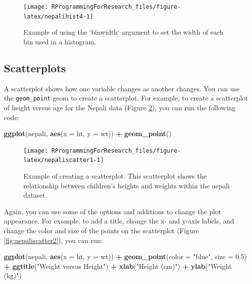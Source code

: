 \documentclass[]{book}
\makeatletter
\newenvironment{Shaded}{\begin{snugshade}}{\end{snugshade}}
\newcommand{\KeywordTok}[1]{\textcolor[rgb]{0.13,0.29,0.53}{\textbf{#1}}}
\newcommand{\DataTypeTok}[1]{\textcolor[rgb]{0.13,0.29,0.53}{#1}}
\newcommand{\FloatTok}[1]{\textcolor[rgb]{0.00,0.00,0.81}{#1}}
\newcommand{\StringTok}[1]{\textcolor[rgb]{0.31,0.60,0.02}{#1}}
\newcommand{\OperatorTok}[1]{\textcolor[rgb]{0.81,0.36,0.00}{\textbf{#1}}}
\newcommand{\NormalTok}[1]{#1}
\newenvironment{kframe}{%
\medskip{}
\setlength{\fboxsep}{.8em}
 \def\at@end@of@kframe{}%
 \ifinner\ifhmode%
  \def\at@end@of@kframe{\end{minipage}}%
  \begin{minipage}{\columnwidth}%
 \fi\fi%
 \def\FrameCommand##1{\hskip\@totalleftmargin \hskip-\fboxsep
 \colorbox{shadecolor}{##1}\hskip-\fboxsep
     \hskip-\linewidth \hskip-\@totalleftmargin \hskip\columnwidth}%
 \MakeFramed {\advance\hsize-\width
   \@totalleftmargin\z@ \linewidth\hsize
   \@setminipage}}%
 {\par\unskip\endMakeFramed%
 \at@end@of@kframe}
\renewenvironment{Shaded}{\begin{kframe}}{\end{kframe}}
\theoremstyle{definition}
\theoremstyle{definition}
\theoremstyle{definition}
\theoremstyle{remark}
\makeatother
\begin{document}
\begin{figure}

{\centering \texttt{[image: RProgrammingForResearch\_files/figure-latex/nepalihist4-1]} 

}

\caption{Example of using the `binwidth` argument to set the width of each bin used in a histogram.}\label{fig:nepalihist4}
\end{figure}

\subsection{Scatterplots}\label{scatterplots}

A scatterplot shows how one variable changes as another changes. You can
use the \texttt{geom\_point} geom to create a scatterplot. For example,
to create a scatterplot of height versus age for the Nepali data (Figure
\ref{fig:nepaliscatter1}), you can run the following code:

\begin{Shaded}
\begin{Highlighting}[]
\KeywordTok{ggplot}\NormalTok{(nepali, }\KeywordTok{aes}\NormalTok{(}\DataTypeTok{x =}\NormalTok{ ht, }\DataTypeTok{y =}\NormalTok{ wt)) }\OperatorTok{+}\StringTok{ }
\StringTok{  }\KeywordTok{geom_point}\NormalTok{()}
\end{Highlighting}
\end{Shaded}

\begin{figure}

{\centering \texttt{[image: RProgrammingForResearch\_files/figure-latex/nepaliscatter1-1]} 

}

\caption{Example of creating a scatterplot. This scatterplot shows the relationship between children's heights and weights within the nepali dataset.}\label{fig:nepaliscatter1}
\end{figure}

Again, you can use some of the options and additions to change the plot
appearance. For example, to add a title, change the x- and y-axis
labels, and change the color and size of the points on the scatterplot
(Figure \ref{fig:nepaliscatter2}), you can run:

\begin{Shaded}
\begin{Highlighting}[]
\KeywordTok{ggplot}\NormalTok{(nepali, }\KeywordTok{aes}\NormalTok{(}\DataTypeTok{x =}\NormalTok{ ht, }\DataTypeTok{y =}\NormalTok{ wt)) }\OperatorTok{+}\StringTok{ }
\StringTok{  }\KeywordTok{geom_point}\NormalTok{(}\DataTypeTok{color =} \StringTok{"blue"}\NormalTok{, }\DataTypeTok{size =} \FloatTok{0.5}\NormalTok{) }\OperatorTok{+}\StringTok{ }
\StringTok{  }\KeywordTok{ggtitle}\NormalTok{(}\StringTok{"Weight versus Height"}\NormalTok{) }\OperatorTok{+}\StringTok{ }
\StringTok{  }\KeywordTok{xlab}\NormalTok{(}\StringTok{"Height (cm)"}\NormalTok{) }\OperatorTok{+}\StringTok{ }\KeywordTok{ylab}\NormalTok{(}\StringTok{"Weight (kg)"}\NormalTok{)}
\end{Highlighting}
\end{Shaded}
\end{document}
